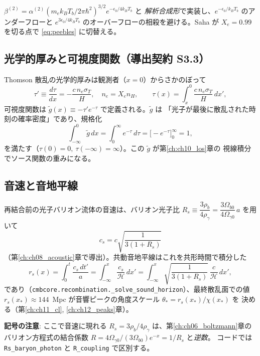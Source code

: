 \begin{numreality}
$\beta^{(2)}=\alpha^{(2)}(m_ek_BT_b/2\pi\hbar^2)^{3/2}e^{-\epsilon_0/4k_BT_b}$ と
\emph{解析合成形}で実装し、$e^{-\epsilon_0/k_BT_b}$ のアンダーフローと
$e^{3\epsilon_0/4k_BT_b}$ のオーバーフローの相殺を避ける。Saha が $X_e=0.99$ を切る点で
\eqref{eq:peebles} に切替える。
\end{numreality}

\subsection{光学的厚みと可視度関数（導出契約 S3.3）}
Thomson 散乱の光学的厚みは観測者（$x=0$）からさかのぼって
\begin{equation}
  \tau'\equiv\frac{d\tau}{dx}=-\frac{c\,n_e\sigma_T}{H},\quad n_e=X_en_H,\qquad
  \tau(x)=\int_x^{0}\frac{c\,n_e\sigma_T}{H}\,dx',
\end{equation}
可視度関数は $\tilde g(x)\equiv-\tau'e^{-\tau}$ で定義される。$\tilde g$ は
「光子が最後に散乱された時刻の確率密度」であり、規格化
\begin{equation}
  \int_{-\infty}^{0}\tilde g\,dx=\int_0^{\infty}e^{-\tau}\,d\tau
  =\big[-e^{-\tau}\big]_0^\infty=1,
\end{equation}
を満たす（$\tau(0)=0,\ \tau(-\infty)=\infty$）。この $\tilde g$ が第\ref{ch:ch10_los}章の
視線積分でソース関数の重みになる。

\subsection{音速と音地平線}
再結合前の光子バリオン流体の音速は、バリオン光子比
$R_s\equiv\dfrac{3\rho_b}{4\rho_\gamma}=\dfrac{3\Omega_{b0}}{4\Omega_{\gamma0}}\,a$ を用いて
\begin{equation}
  c_s=c\sqrt{\frac{1}{3(1+R_s)}}
  \label{eq:cs}
\end{equation}
（第\ref{ch:ch08_acoustic}章で導出）。共動音地平線はこれを共形時間で積分した
\begin{equation}
  r_s(x)=\int_0^{t}\frac{c_s\,dt'}{a}=\int_{-\infty}^{x}\frac{c_s}{\mathcal H}\,dx'
  =\int_{-\infty}^{x}\sqrt{\frac{1}{3(1+R_s)}}\,\frac{c}{\mathcal H}\,dx',
  \label{eq:rs}
\end{equation}
であり（\texttt{cmbcore.recombination.\_solve\_sound\_horizon}）、最終散乱面での値
$r_s(x_*)\approx144$~Mpc が音響ピークの角度スケール $\theta_*=r_s(x_*)/\chi(x_*)$ を
決める（第\ref{ch:ch11_cl}, \ref{ch:ch12_peaks}章）。

\begin{numreality}
\textbf{記号の注意}: ここで音速に現れる $R_s=3\rho_b/4\rho_\gamma$ は、第\ref{ch:ch06_boltzmann}章の
バリオン方程式の結合係数 $R=4\Omega_{\gamma0}/(3\Omega_{b0})e^{-x}=1/R_s$ と\emph{逆数}。
コードでは \texttt{Rs\_baryon\_photon} と \texttt{R\_coupling} で区別する。
\end{numreality}

